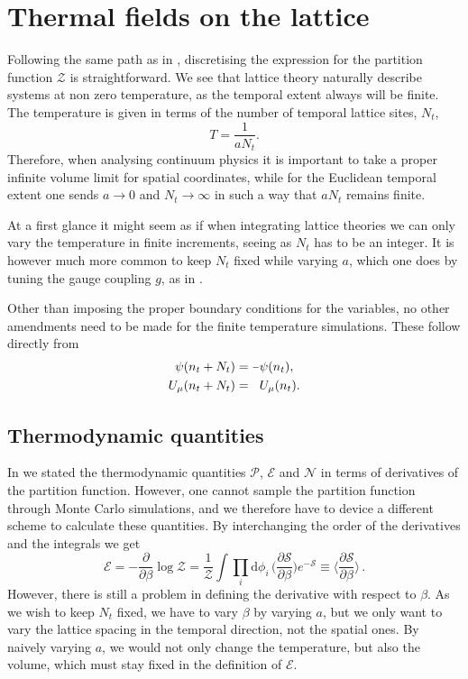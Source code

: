 \section{Thermal fields on the lattice} \label{sec:thermal-lattice-theory}

Following the same path as in , discretising the
expression for the partition function $\mathcal{Z}$ is straightforward. We see
that lattice theory naturally describe systems at non zero temperature, as the
temporal extent always will be finite. The temperature is given in terms of the
number of temporal lattice sites, $N_t$,
%
\begin{equation}
  T = \frac{1}{a N_t}.
\end{equation}
%
Therefore, when analysing continuum physics it is important to take a proper
infinite volume limit for spatial coordinates, while for the Euclidean temporal
extent one sends $a\to0$ and $N_t\to\infty$ in such a way that $a N_t$ remains
finite.

At a first glance it might seem as if when integrating lattice theories we can
only vary the temperature in finite increments, seeing as $N_t$ has to be an integer.
It is however much more common to keep $N_t$ fixed while varying $a$, which one
does by tuning the gauge coupling $g$, as in .

Other than imposing the proper boundary conditions for the variables, no other
amendments need to be made for the finite temperature simulations. These follow
directly from 
%
\begin{align}
  \psi(n_t + N_t) &= \minus \psi(n_t), \\
  U_{\mu}(n_t + N_t) &= \hphantom{\minus} U_{\mu}(n_t).
\end{align}

\subsection{Thermodynamic quantities}

In  we stated the thermodynamic quantities $\mathcal{P}$,
$\mathcal{E}$ and $\mathcal{N}$ in terms of derivatives of the partition
function. However, one cannot sample the partition function through Monte Carlo
simulations, and we therefore have to device a different scheme to calculate
these quantities. By interchanging the order of the derivatives and the
integrals we get 
%
\begin{equation}
  \mathcal{E} = \minus\frac{\partial}{\partial \beta} \log \mathcal{Z}
    = \frac{1}{\mathcal{Z}} \int \prod_i \mathrm{d} \phi_i \, 
    \bigg( \frac{\partial\mathcal{S}}{\partial \beta} \bigg) e^{-\mathcal{S}}
    \equiv \bigg\langle \frac{\partial\mathcal{S}}{\partial \beta} \bigg\rangle
    \,.
\end{equation}
%
However, there is still a problem in defining the derivative with respect to
$\beta$. As we wish to keep $N_t$ fixed, we have to vary $\beta$ by varying $a$,
but we only want to vary the lattice spacing in the temporal direction, not the
spatial ones. By naively varying $a$, we would not only change the temperature,
but also the volume, which must stay fixed in the definition of
$\mathcal{E}$.

